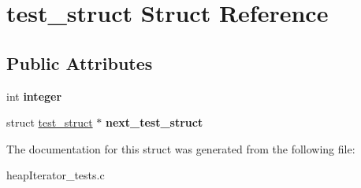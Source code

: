 \hypertarget{structtest__struct}{}\section{test\+\_\+struct Struct Reference}
\label{structtest__struct}
\subsection*{Public Attributes}
\begin{DoxyCompactItemize}
\item 
\hypertarget{structtest__struct_a4c9a8614a1f95013c4664e67a6b228ff}{}int {\bfseries integer}\label{structtest__struct_a4c9a8614a1f95013c4664e67a6b228ff}

\item 
\hypertarget{structtest__struct_a2983cdbc65276ce4482d3ba00f1ab9a6}{}struct \hyperlink{structtest__struct}{test\+\_\+struct} $\ast$ {\bfseries next\+\_\+test\+\_\+struct}\label{structtest__struct_a2983cdbc65276ce4482d3ba00f1ab9a6}

\end{DoxyCompactItemize}


The documentation for this struct was generated from the following file\+:\begin{DoxyCompactItemize}
\item 
heap\+Iterator\+\_\+tests.\+c\end{DoxyCompactItemize}
